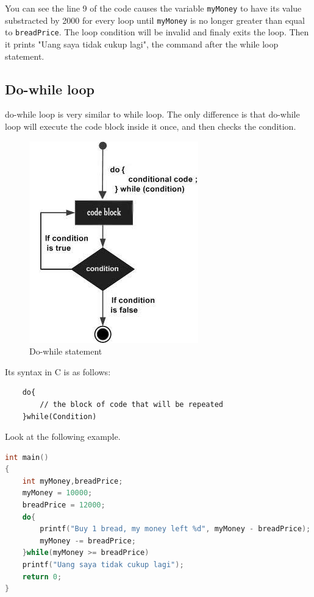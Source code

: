 You can see the line 9 of the code causes the variable \verb|myMoney| to have its value substracted by 2000 for every loop until \verb|myMoney| is no longer greater than equal to \verb|breadPrice|. 
The loop condition will be invalid and finaly exits the loop. Then it prints "Uang saya tidak cukup lagi", the command after the while loop statement.
\subsection{Do-while loop}
do-while loop is very similar to while loop. The only difference is that do-while loop will execute the code block inside it once, and then checks the condition.
\begin{figure}[H]
		\centering
		\includegraphics[width=0.4\linewidth]{../P2/img/dowhileloop.png}
		\caption{Do-while statement}
		\label{fig:dowhileloop}
\end{figure}
Its syntax in C is as follows:
\begin{verbatim}
    do{
        // the block of code that will be repeated
    }while(Condition)
\end{verbatim}
Look at the following example.
\begin{lstlisting}[language=c,caption = Do-while implementation example,label=lst:dowhileexample01]
int main()
{
	int myMoney,breadPrice;
	myMoney = 10000;
	breadPrice = 12000;
	do{
	    printf("Buy 1 bread, my money left %d", myMoney - breadPrice);
	    myMoney -= breadPrice;
	}while(myMoney >= breadPrice)
	printf("Uang saya tidak cukup lagi");
	return 0;
}
\end{lstlisting}  
